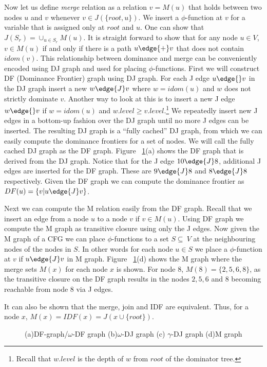 Now let us define {\em merge} relation as a relation $v=M(u)$
that holds between two nodes $u$ and $v$ whenever
$v \in J(\{root, u\})$. We insert a $\phi$-function at $v$ for a variable that is assigned
only at $root$ and $u$. One can show that $J(S_r) = \cup_{u \in S_r} M(u)$. It is 
straight forward to show that for any node $u \in V$, $v \in M(u)$ if and only if
there is a path $u \edge{+} v$ that does not contain $idom(v)$. This relationship between
dominance and merge can be conveniently encoded using DJ graph and used for placing 
$\phi$-functions. First we will construct DF (Dominance Frontier) graph using DJ graph.
For each J edge $u \edge{} v$ in the DJ graph insert a new  $w \edge{J} v$ where
$w = idom (u)$ and $w$ does not strictly dominate $v$. Another way to
look at this is to insert a new J edge $w \edge{} v$ if $w = idom(u)$ and
$w.level \geq v.level$.\footnote{Recall that $w.level$ is the depth of $w$ from
$root$ of the dominator tree.} We repeatedly insert new J edges in a bottom-up fashion
over the DJ graph until no more J edges can be inserted. The resulting
DJ graph is a ``fully cached'' DJ graph, from which we can easily compute
the dominance frontiers for a set of nodes. We will call the fully cached
DJ graph as the DF graph. Figure ~\ref{fig:mgraph}(a) shows the DF graph
that is derived from the DJ graph. Notice that for the J edge $10 \edge{J} 8$, additional
J edges are inserted for the DF graph. These are $9 \edge{J} 8$ and $8 \edge{J} 8$ respectively.
Given the DF graph we can compute
the dominance frontier as $DF(u) = \{ v | u \edge{J} v\}$.


Next we can compute the M relation easily from the DF graph. 
Recall that  we insert an edge from a node $u$ to
a node $v $ if $v \in M(u)$. Using DF graph we compute
the M graph as transitive closure
using only the J edges. Now given the M graph of
a CFG we can place $\phi$-functions to a set $S \subseteq \ V$ at the neighbouring nodes
of the nodes in $S$. In other words for each node $u \in S$ we place a $\phi$-function
at $v$ if $u \edge{J} v$ in M graph. Figure ~\ref{fig:mgraph}(d) shows the M graph 
where the merge sets $M(x)$ for each node $x$ is shown.
For node 8, $M(8) = \{2,5,6,8\}$, as the transitive closure on the DF graph results in
the nodes $2, 5, 6$ and $8$ becoming reachable from node 8 via J edges. 

It can also be shown that the merge, join and IDF are equivalent. Thus, for a node $x$,
$M(x) = IDF(x) = J(x \cup \{root\})$.


    \begin{figure}[htb]
    \caption{(a)DF-graph/$\omega$-DF graph (b)$\omega$-DJ graph (c) $\gamma$-DJ graph (d)M graph}
    \label{fig:mgraph}
    \end{figure} 


